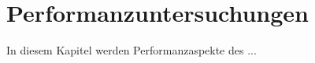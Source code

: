 \section{Performanzuntersuchungen}
\label{Performanz}

In diesem Kapitel werden Performanzaspekte des ...

\pagebreak 